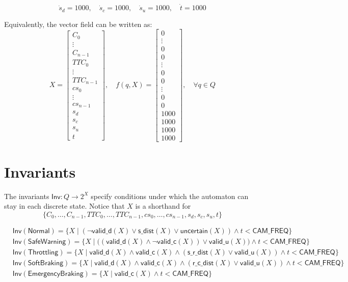 \documentclass[12pt]{article}
\theoremstyle{definition}
\begin{document}
\[
\dot{s}_d = 1000, \quad \dot{s}_c = 1000, \quad \dot{s}_u = 1000, \quad \dot{t} = 1000
\]

Equivalently, the vector field can be written as:
\[
X = 
\begin{bmatrix}
    C_0 \\ \vdots \\ C_{n-1} \\ 
    TTC_0 \\ \vdots \\ TTC_{n-1} \\ 
    cs_0 \\ \vdots \\ cs_{n-1} \\ 
    s_d \\ s_c \\ s_u \\ t
\end{bmatrix}, \quad
f(q, X) =
\begin{bmatrix}
    0 \\ \vdots \\ 0 \\ 
    0 \\ \vdots \\ 0 \\ 
    0 \\ \vdots \\ 0 \\ 0 \\
    1000 \\ 1000 \\ 1000 \\ 1000
\end{bmatrix}, \quad \forall q \in Q
\]

\section{Invariants}

The invariants $\mathsf{Inv}: Q \to 2^X$ specify conditions under which the automaton can stay in each discrete state.
Notice that $X$ is a shorthand for 
\[\{C_0, \ldots, C_{n-1}, TTC_0, \ldots, TTC_{n-1}, cs_0, \ldots, cs_{n-1}, s_d, s_c, s_u, t\}\]

\[
\begin{aligned}
&\mathsf{Inv}(\mathsf{Normal}) = \{ X \mid (\neg \mathsf{valid\_d}(X) \lor \mathsf{s\_dist}(X) \lor \mathsf{uncertain}(X)) \land t < \mathsf{CAM\_FREQ} \} \\
&\mathsf{Inv}(\mathsf{SafeWarning}) = \{ X \mid \big((\mathsf{valid\_d}(X) \land \neg \mathsf{valid\_c}(X)) \lor \mathsf{valid\_u}(X)\big) \land t < \mathsf{CAM\_FREQ}\} \\
&\mathsf{Inv}(\mathsf{Throttling}) = \{ X \mid \mathsf{valid\_d}(X) \land \mathsf{valid\_c}(X) \land (\mathsf{s\_r\_dist}(X) \lor  \mathsf{valid\_u}(X) ) \land t < \mathsf{CAM\_FREQ} \} \\
&\mathsf{Inv}(\mathsf{SoftBraking}) = \{ X \mid \mathsf{valid\_d}(X) \land \mathsf{valid\_c}(X) \land (\mathsf{r\_c\_dist}(X) \lor  \mathsf{valid\_u}(X) ) \land t < \mathsf{CAM\_FREQ} \} \\
&\mathsf{Inv}(\mathsf{EmergencyBraking}) = \{ X \mid \mathsf{valid\_c}(X) \land t < \mathsf{CAM\_FREQ}\}
\end{aligned}
\]
\end{document}
